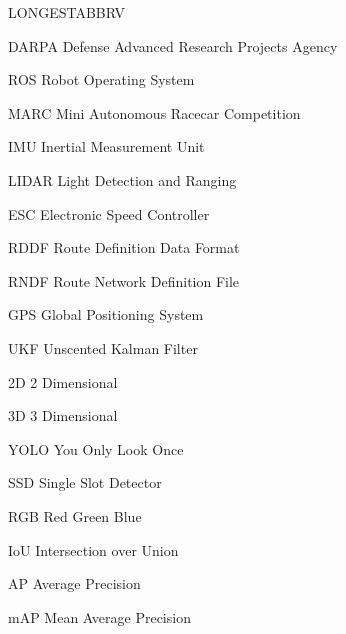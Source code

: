 \begin{theglossary}{LONGESTABBRV}

\item[DARPA] Defense Advanced Research Projects Agency
\item[ROS] Robot Operating System
\item[MARC] Mini Autonomous Racecar Competition
\item[IMU] Inertial Measurement Unit
\item[LIDAR] Light Detection and Ranging
\item[ESC] Electronic Speed Controller
\item[RDDF] Route Definition Data Format
\item[RNDF] Route Network Definition File
\item[GPS] Global Positioning System
\item[UKF] Unscented Kalman Filter
\item[2D] 2 Dimensional
\item[3D] 3 Dimensional
\item[YOLO] You Only Look Once
\item[SSD] Single Slot Detector
\item[RGB] Red Green Blue
\item[IoU] Intersection over Union
\item[AP] Average Precision
\item[mAP] Mean Average Precision

\end{theglossary}
